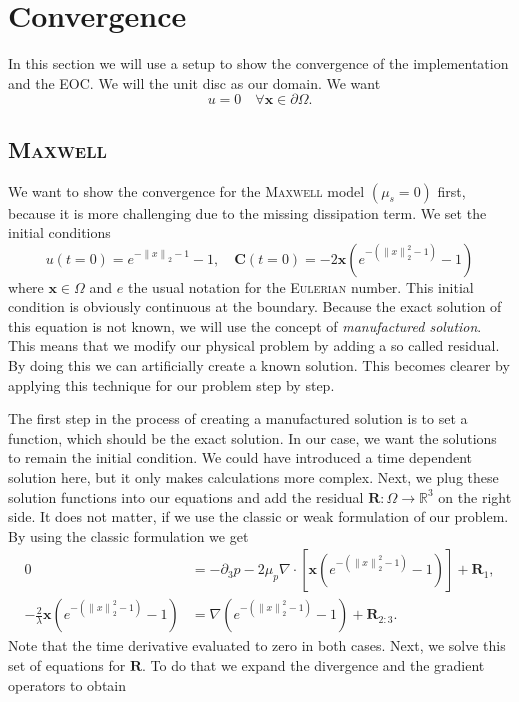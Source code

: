 \documentclass[12pt,a4paper,twoside, open=right]{scrreprt}
\theoremstyle{definition}
\theoremstyle{plain}
\newcommand{\rr}{\mathbb{R}}
\newcommand{\norm}[1]{\left\lVert#1\right\rVert}
\newcommand{\bfC}{\bm{C}}
\newcommand{\bfx}{\bm{x}}
\newcommand{\bfR}{\bm{R}}
\begin{document}
\section{Convergence}
In this section we will use a setup to show the convergence of the implementation and the EOC. We will the unit disc as our domain. We want 
\begin{equation}
    u = 0\quad\forall\bfx\in\partial\Omega.
\end{equation}
\subsection{\textsc{Maxwell}}
We want to show the convergence for the \textsc{Maxwell} model $(\mu_s=0)$ first, because it is more challenging due to the missing dissipation term.
We set the initial conditions
\begin{equation}
    u(t=0) = e^{-\norm{x}_2-1}-1,
    \quad\bfC(t=0) = -2\bfx(e^{-(\norm{x}_2^2 -1)}-1)
\end{equation}
where $\bfx\in\Omega$ and $e$ the usual notation for the \textsc{Eulerian} number. This initial condition is obviously continuous at the boundary. Because the exact solution of this equation is not known, we will use the concept of \emph{manufactured solution}. This means that we modify our physical problem by adding a so called residual. By doing this we can artificially create a known solution. This becomes clearer by applying this technique for our problem step by step.\par 
The first step in the process of creating a manufactured solution is to set a function, which should be the exact solution. In our case, we want the solutions to remain the initial condition. We could have introduced a time dependent solution here, but it only makes calculations more complex. Next, we plug these solution functions into our equations and add the residual $\bfR\colon\Omega\to\rr^3$ on the right side. It does not matter, if we use the classic or weak formulation of our problem. By using the classic formulation we get
\begin{align}
    0 &= -\partial_3 p-2\mu_p \nabla\cdot [\bfx(e^{-(\norm{x}_2^2 -1)}-1)] +\bfR_1,\\
    -\frac{2}{\lambda}\bfx(e^{-(\norm{x}_2^2 -1)}-1)&= \nabla (e^{-(\norm{x}_2^2 -1)}-1) +\bfR_{2:3}.
\end{align}
Note that the time derivative evaluated to zero in both cases. Next, we solve this set of equations for $\bfR$. To do that we expand the divergence and the gradient operators to obtain
\end{document}
